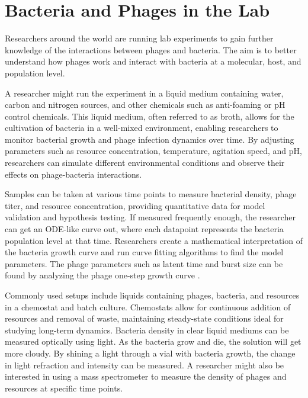 \section{Bacteria and Phages in the Lab}
Researchers around the world are running lab experiments to gain further knowledge of the interactions between phages and bacteria. 
The aim is to better understand how phages work and interact with bacteria at a molecular, host, and population level. 

A researcher might run the experiment in a liquid medium containing water, carbon and nitrogen sources, and other chemicals such as anti-foaming or pH control chemicals. 
This liquid medium, often referred to as broth, allows for the cultivation of bacteria in a well-mixed environment, enabling researchers to monitor bacterial growth and phage infection dynamics over time. 
By adjusting parameters such as resource concentration, temperature, agitation speed, and pH, researchers can simulate different environmental conditions and observe their effects on phage-bacteria interactions. 

Samples can be taken at various time points to measure bacterial density, phage titer, and resource concentration, providing quantitative data for model validation and hypothesis testing. 
If measured frequently enough, the researcher can get an ODE-like curve out, where each datapoint represents the bacteria population level at that time. 
Researchers create a mathematical interpretation of the bacteria growth curve and run curve fitting algorithms to find the model parameters. 
The phage parameters such as latent time and burst size can be found by analyzing the phage one-step growth curve \cite{gengUsingBacterialPopulation2024, mullaExtremeDiversityPhage2024}. 

Commonly used setups include liquids containing phages, bacteria, and resources in a chemostat and batch culture. 
Chemostats allow for continuous addition of resources and removal of waste, maintaining steady-state conditions ideal for studying long-term dynamics.
Bacteria density in clear liquid mediums can be measured optically using light. 
As the bacteria grow and die, the solution will get more cloudy. 
By shining a light through a vial with bacteria growth, the change in light refraction and intensity can be measured. 
A researcher might also be interested in using a mass spectrometer to measure the density of phages and resources at specific time points. 

